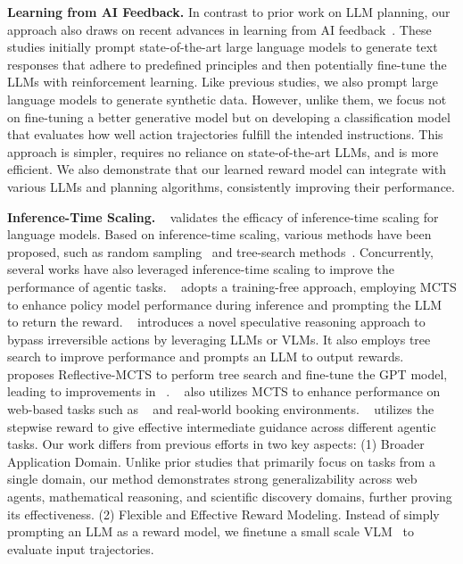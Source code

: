 \textbf{Learning from AI Feedback.} In contrast to prior work on LLM planning, our approach also draws on recent advances in learning from AI feedback~\citep{bai2022constitutional,lee2023rlaif,yuan2024self,sharma2024critical,pan2024autonomous,koh2024tree}. These studies initially prompt state-of-the-art large language models to generate text responses that adhere to predefined principles and then potentially fine-tune the LLMs with reinforcement learning. Like previous studies, we also prompt large language models to generate synthetic data. However, unlike them, we focus not on fine-tuning a better generative model but on developing a classification model that evaluates how well action trajectories fulfill the intended instructions. This approach is simpler, requires no reliance on state-of-the-art LLMs, and is more efficient. We also demonstrate that our learned reward model can integrate with various LLMs and planning algorithms, consistently improving their performance.

\textbf{Inference-Time Scaling.} ~\citet{snell2024scaling} validates the efficacy of inference-time scaling for language models. Based on inference-time scaling, various methods have been proposed, such as random sampling~\citep{wang2022self} and tree-search methods~\citep{hao2023reasoning, zhang2024accessing, guan2025rstar}. Concurrently, several works have also leveraged inference-time scaling to improve the performance of agentic tasks. ~\citet{koh2024tree} adopts a training-free approach, employing MCTS to enhance policy model performance during inference and prompting the LLM to return the reward. ~\citet{gu2024your} introduces a novel speculative reasoning approach to bypass irreversible actions by leveraging LLMs or VLMs. It also employs tree search to improve performance and prompts an LLM to output rewards. ~\citet{yu2024exact} proposes Reflective-MCTS to perform tree search and fine-tune the GPT model, leading to improvements in ~\citet{koh2024visualwebarena}. ~\citet{putta2024agent} also utilizes MCTS to enhance performance on web-based tasks such as ~\citet{yao2023webshopscalablerealworldweb} and real-world booking environments. ~\cite{lin2025qlass} utilizes the stepwise reward to give effective intermediate guidance across different agentic tasks. Our work differs from previous efforts in two key aspects: (1) Broader Application Domain. Unlike prior studies that primarily focus on tasks from a single domain, our method demonstrates strong generalizability across web agents, mathematical reasoning, and scientific discovery domains, further proving its effectiveness. (2) Flexible and Effective Reward Modeling. Instead of simply prompting an LLM as a reward model, we finetune a small scale VLM~\citep{lin2023vila} to evaluate input trajectories. %

